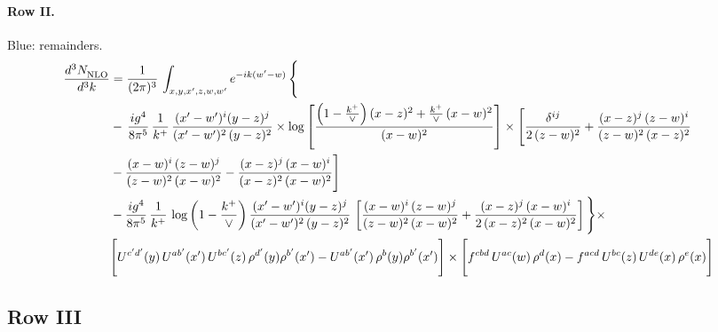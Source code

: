\documentclass[10pt]{article}
\numberwithin{equation}{section}
\newcommand{\new}[1]{{\color{blue}#1}}
\begin{document}
\paragraph{Row II.}
\new{Blue}: remainders.
\begin{align}
     \frac{d^{3}N_{\rm NLO}^{\rm}}{d^{3}k}  & =   \frac{1}{(2\pi)^{3}}\, \int_{x,y,x',z,w,w^{\prime}} e^{-ik(w^{\prime}-w)}\, \Bigg\{\notag \\
& -\,\frac{ig^{4}}{8\pi^{5}}\,\frac{1}{k^{+}}\,\frac{(x'-w')^{i}(y-z)^{j}}{(x'-w')^{2}\,(y-z)^{2}}\times \log{\left[\frac{\left(1-\frac{k^{+}}{\vee}\right)(x-z)^{2}+\frac{k^{+}}{\vee}\,(x-w)^{2}}{(x-w)^{2}}\right]}\times \Bigg[\frac{\delta^{ij}}{2\,(z-w)^{2}}+\frac{(x-z)^{j}\,(z-w)^{i}}{(z-w)^{2}\,(x-z)^{2}}\notag \\ & -\frac{(x-w)^{i}\,(z-w)^{j}}{(z-w)^{2}\,(x-w)^{2}}-\frac{(x-z)^{j}\,(x-w)^{i}}{(x-z)^{2}\,(x-w)^{2}}\Bigg] \notag \\
& -\frac{ig^{4}}{8\pi^{5}}\,\frac{1}{k^{+}}\,\log{\left(1-\frac{k^{+}}{\vee}\right)}\,\frac{(x'-w')^{i}(y-z)^{j}}{(x'-w')^{2}\,(y-z)^{2}}\,\left[\frac{(x-w)^{i}\,(z-w)^{j}}{(z-w)^{2}\,(x-w)^{2}}+\frac{(x-z)^{j}\,(x-w)^{i}}{2\,(x-z)^{2}\, (x-w)^{2}}\right]\Bigg\}\times \notag \\ & \Bigg[U^{c'd'}(y)\,U^{ab'}(x')\,U^{bc'}(z)\,\rho^{d'}(y)\rho^{b'}(x')-U^{ab'}(x')\,\rho^{b}(y)\rho^{b'}(x')\Bigg]\times\Bigg[f^{cbd}\,U^{ac}(w)\,\rho^{d}(x)-f^{acd}\, U^{bc}(z)\,U^{de}(x)\,\rho^{e}(x)\Bigg] \label{eq:F:G3II}
\end{align}

\subsection{Row III}
\end{document}
